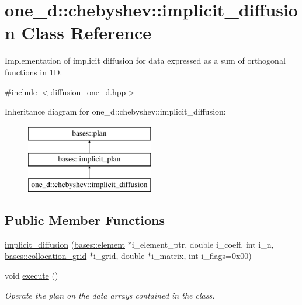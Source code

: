 \hypertarget{classone__d_1_1chebyshev_1_1implicit__diffusion}{\section{one\-\_\-d\-:\-:chebyshev\-:\-:implicit\-\_\-diffusion Class Reference}
\label{classone__d_1_1chebyshev_1_1implicit__diffusion}
}


Implementation of implicit diffusion for data expressed as a sum of orthogonal functions in 1\-D.  




{\ttfamily \#include $<$diffusion\-\_\-one\-\_\-d.\-hpp$>$}

Inheritance diagram for one\-\_\-d\-:\-:chebyshev\-:\-:implicit\-\_\-diffusion\-:\begin{figure}[H]
\begin{center}
\leavevmode
\includegraphics[height=3.000000cm]{classone__d_1_1chebyshev_1_1implicit__diffusion}
\end{center}
\end{figure}
\subsection*{Public Member Functions}
\begin{DoxyCompactItemize}
\item 
\hyperlink{classone__d_1_1chebyshev_1_1implicit__diffusion_a35446cbf70197754a5039cd8bfc3d30e}{implicit\-\_\-diffusion} (\hyperlink{classbases_1_1element}{bases\-::element} $\ast$i\-\_\-element\-\_\-ptr, double i\-\_\-coeff, int i\-\_\-n, \hyperlink{classbases_1_1collocation__grid}{bases\-::collocation\-\_\-grid} $\ast$i\-\_\-grid, double $\ast$i\-\_\-matrix, int i\-\_\-flags=0x00)
\item 
void \hyperlink{classone__d_1_1chebyshev_1_1implicit__diffusion_a5da5289b943a5d3384c7b0341f890125}{execute} ()
\begin{DoxyCompactList}\small\item\em Operate the plan on the data arrays contained in the class. \end{DoxyCompactList}\end{DoxyCompactItemize}
